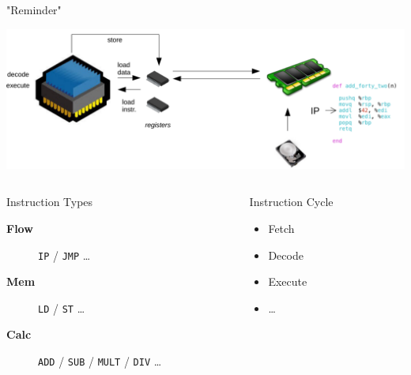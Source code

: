 \documentclass[presentation]{beamer}
\begin{document}
\begin{frame}[label={sec:orgb1a1d2b},fragile]{"Reminder"}
 \begin{center}
\includegraphics[width=.8\textwidth]{./images/cpu.png}
\end{center}
\pause
\begin{columns}
\begin{column}{.70\columnwidth}
\begin{block}{Instruction Types}
\begin{description}
\item[{\bf \black Flow}] \texttt{IP} / \texttt{JMP} \ldots{} \hfill
\item[{\bf \black Mem}] \texttt{LD} / \texttt{ST} \ldots{}  \hfill
\item[{\bf \black Calc}] \texttt{ADD} / \texttt{SUB} / \texttt{MULT} / \texttt{DIV} \ldots{} \hfill
\pause
\end{description}
\end{block}
\end{column}
\begin{column}{.29\columnwidth}
\begin{block}{Instruction Cycle}
\begin{itemize}
\item \small Fetch
\item \small Decode
\item \small Execute
\item \small \ldots{}
\end{itemize}
\end{block}
\end{column}
\end{columns}
\end{frame}
\end{document}
